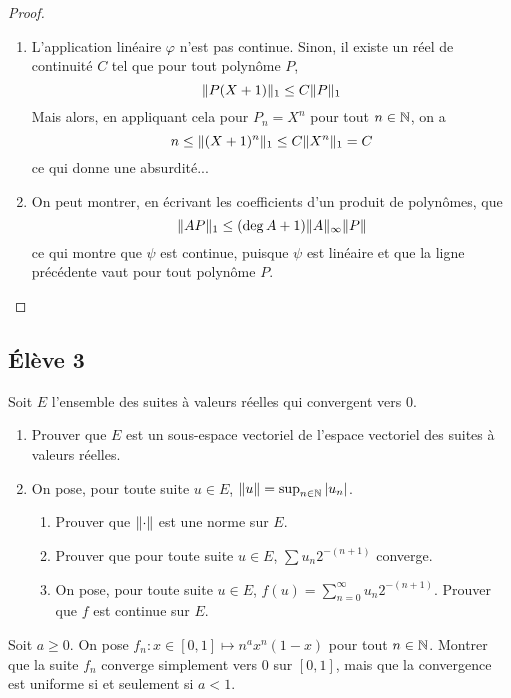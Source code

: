 \documentclass[10pt]{scrartcl}
\begin{document}
    \begin{proof}\hfill
        \begin{enumerate}
            \item L'application linéaire $\varphi$ n'est pas continue. Sinon, il existe un réel de continuité $C$ tel que pour tout polynôme $P$, 
            \[
                \lVert P(X+1)\rVert_1\leq C\lVert P\rVert_1
            \]
            Mais alors, en appliquant cela pour $P_n=X^n$ pour tout $n\in\operatorname{\mathbb N}$, on a 
            \[
                n\leq \lVert (X+1)^n\rVert_1\leq C\lVert X^n\rVert_1=C
            \]
            ce qui donne une absurdité... 
            \item On peut montrer, en écrivant les coefficients d'un produit de polynômes, que 
            \[
                \lVert AP\rVert_1\leq (\deg A+1)\lVert A\rVert_\infty \lVert P\rVert
            \]
            ce qui montre que $\psi$ est continue, puisque $\psi$ est linéaire et que la ligne précédente vaut pour tout polynôme $P$.
        \end{enumerate}
    \end{proof}

    \subsection*{Élève 3}

    \begin{ccp}
        Soit $E$ l'ensemble des suites à valeurs réelles qui convergent vers $0$. 
        \begin{enumerate}
            \item Prouver que $E$ est un sous-espace vectoriel de l'espace vectoriel des suites à valeurs réelles. 
            \item On pose, pour toute suite $u\in E$, $\lVert u\rVert=\sup_{n\in\operatorname{\mathbb N}}|u_n|$.
            \begin{enumerate}
                \item Prouver que $\lVert \cdot\rVert$ est une norme sur $E$.
                \item Prouver que pour toute suite $u\in E$, $\sum u_n2^{-(n+1)}$ converge.
                \item On pose, pour toute suite $u\in E$, $f(u)=\sum_{n=0}^\infty u_n2^{-(n+1)}$. Prouver que $f$ est continue sur $E$.
            \end{enumerate}
        \end{enumerate}
    \end{ccp}

    \begin{exo}
       Soit $a\geq 0$. On pose $f_n:x\in[0,1]\mapsto n^ax^n(1-x)$ pour tout $n\in \operatorname{\mathbb N}$. Montrer que la suite $f_n$ converge simplement vers $0$ sur $[0,1]$, mais que la convergence est uniforme si et seulement si $a<1$.
    \end{exo}
\end{document}

